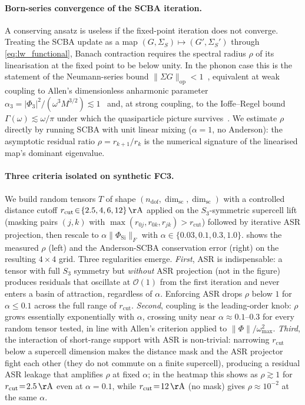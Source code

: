 \paragraph{Born-series convergence of the SCBA iteration.} A conserving ansatz is useless
if the fixed-point iteration does not converge. Treating the SCBA update as a map
$(G,\Sigma_S)\!\mapsto\!(G',\Sigma_S')$ through \cref{eq:lw_functional}, Banach contraction
requires the spectral radius $\rho$ of its linearisation at the fixed point to be below
unity. In the phonon case this is the statement of the Neumann-series bound
$\|\Sigma G\|_{\mathrm{op}}\!<\!1$~\cite{vanLeeuwen_Stefanucci_NonequilibriumManyBody_2013},
equivalent at weak coupling to Allen's dimensionless anharmonic parameter
$\alpha_3 = |\Phi_3|^{2}/(\omega^{3}M^{3/2})\!\lesssim\!1$~\cite{allen_anharmonic_2015}
and, at strong coupling, to the Ioffe--Regel bound $\Gamma(\omega)\!\lesssim\!\omega/\pi$
under which the quasiparticle picture survives~\cite{simoncelli_unified_2019,
ravichandran_unified_2020}. We estimate $\rho$ directly by running SCBA with unit linear
mixing ($\alpha\!=\!1$, no Anderson): the asymptotic residual ratio
$\rho = r_{k+1}/r_k$ is the numerical signature of the linearised map's dominant
eigenvalue.

\paragraph{Three criteria isolated on synthetic FC3.} We build random tensors $T$ of
shape $(n_{\mathrm{dof}},\dim_{\mathrm{sc}},\dim_{\mathrm{sc}})$ with a controlled
distance cutoff $r_{\mathrm{cut}}\!\in\!\{2.5,4,6,12\}\,\mathrm{\AA}$ applied on the
$S_3$-symmetric supercell lift (masking pairs $(j,k)$ with
$\max(r_{0j},r_{0k},r_{jk})\!>\!r_{\mathrm{cut}}$) followed by iterative ASR projection,
then rescale to $\alpha \|\Phi_{\mathrm{Si}}\|_F$ with
$\alpha\!\in\!\{0.03,0.1,0.3,1.0\}$.  shows the measured
$\rho$ (left) and the Anderson-SCBA conservation error (right) on the resulting
$4{\times}4$ grid. Three regularities emerge.
\emph{First}, ASR is indispensable: a tensor with full $S_3$ symmetry but \emph{without}
ASR projection (not in the figure) produces residuals that oscillate at $\mathcal{O}(1)$
from the first iteration and never enters a basin of attraction, regardless of $\alpha$.
Enforcing ASR drops $\rho$ below $1$ for $\alpha\!\le\!0.1$ across the full range of
$r_{\mathrm{cut}}$. \emph{Second}, coupling is the leading-order knob: $\rho$ grows
essentially exponentially with $\alpha$, crossing unity near $\alpha\!\approx\!0.1$--$0.3$
for every random tensor tested, in line with Allen's criterion applied to
$\|\Phi\|/\omega_{\max}^{2}$. \emph{Third}, the interaction of short-range support with
ASR is non-trivial: narrowing $r_{\mathrm{cut}}$ below a supercell dimension makes the
distance mask and the ASR projector fight each other (they do not commute on a finite
supercell), producing a residual ASR leakage that amplifies $\rho$ at fixed $\alpha$; in
the heatmap this shows as $\rho\!\gtrsim\!1$ for $r_{\mathrm{cut}}\!=\!2.5\,\mathrm{\AA}$
even at $\alpha\!=\!0.1$, while $r_{\mathrm{cut}}\!=\!12\,\mathrm{\AA}$ (no mask) gives
$\rho\!\approx\!10^{-2}$ at the same $\alpha$.

